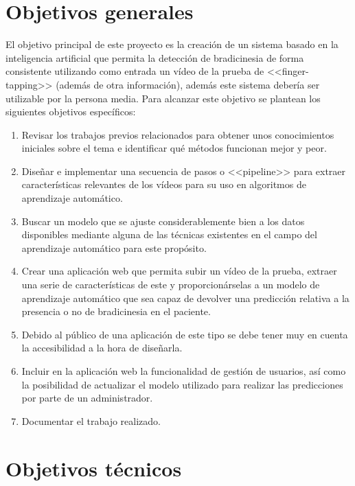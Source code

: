 \label{cha:Objetivos del proyecto}

\section{Objetivos generales}

El objetivo principal de este proyecto es la creación de un sistema basado en la
inteligencia artificial que permita la detección de bradicinesia de forma
consistente utilizando como entrada un vídeo de la prueba de <<finger-tapping>>
(además de otra información), además este sistema debería ser utilizable por la
persona media. Para alcanzar este objetivo se plantean los siguientes objetivos
específicos:

\begin{enumerate}
    \item Revisar los trabajos previos relacionados para obtener unos
    conocimientos iniciales sobre el tema e identificar qué métodos funcionan
    mejor y peor.
    \item Diseñar e implementar una secuencia de pasos o <<pipeline>> para
    extraer características relevantes de los vídeos para su uso en algoritmos
    de aprendizaje automático.
    \item Buscar un modelo que se ajuste considerablemente bien a los datos
    disponibles mediante alguna de las técnicas existentes en el campo del
    aprendizaje automático para este propósito.
    \item Crear una aplicación web que permita subir un vídeo de la prueba,
    extraer una serie de características de este y proporcionárselas a un modelo
    de aprendizaje automático que sea capaz de devolver una predicción relativa
    a la presencia o no de bradicinesia en el paciente.
    \item Debido al público de una aplicación de este tipo se debe tener muy en
    cuenta la accesibilidad a la hora de diseñarla.
    \item Incluir en la aplicación web la funcionalidad de gestión de usuarios,
    así como la posibilidad de actualizar el modelo utilizado para realizar las
    predicciones por parte de un administrador.
    \item Documentar el trabajo realizado.
\end{enumerate}

\section{Objetivos técnicos}

